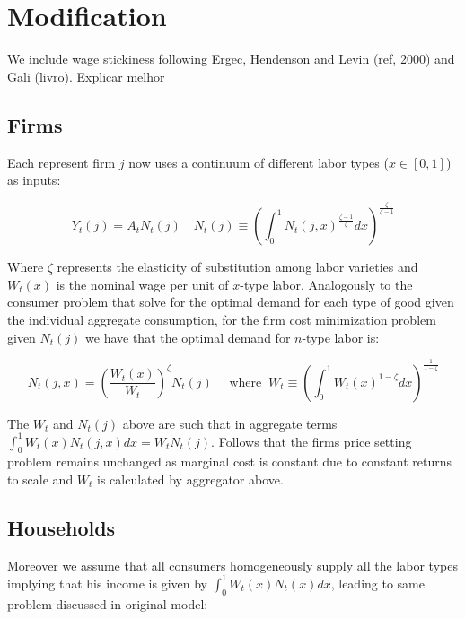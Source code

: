 \documentclass{article}
\begin{document}
\begin{figure}[H]
\centering


\end{figure}

\section{Modification}
We include wage stickiness following Ergec, Hendenson and Levin (ref, 2000) and Gali (livro). Explicar melhor

\subsection{Firms}
Each represent firm $j$ now uses a continuum of different labor types ($x \in [0,1]$) as inputs:

\begin{equation}
    Y_t(j) = A_t N_t(j) \quad N_t(j) \equiv \left( \int^1_0 N_t(j, x)^{\frac{\zeta-1}{\zeta}} dx \right)^{\frac{\zeta}{\zeta-1}}
\end{equation}

Where $\zeta$ represents the elasticity of substitution among labor varieties and $W_t(x)$ is the nominal wage per unit of $x$-type labor. Analogously to the consumer problem that solve for the optimal demand for each type of good given the individual aggregate consumption, for the firm cost minimization problem given $N_t(j)$ we have that the optimal demand for $n$-type labor is:

\begin{equation}
    N_t(j,x) = \left(\frac{W_t(x)}{W_t} \right)^\zeta N_t(j) \quad \textrm{ where } \ W_t \equiv \left(\int^1_0 W_t(x)^{1-\zeta} dx \right)^{\frac{1}{1-\zeta}}
\end{equation}

The $W_t$ and $N_t(j)$ above are such that in aggregate terms $\int^1_0 W_t(x) N_t(j,x) dx = W_t N_t(j)$. Follows that the firms price setting problem remains unchanged as marginal cost is constant due to constant returns to scale and $W_t$ is calculated by aggregator above.

\subsection{Households}
Moreover we assume that all consumers homogeneously supply all the labor types implying that his income is given by $\int^1_0 W_t(x) N_t(x) dx$, leading to same problem discussed in original model:
\end{document}
